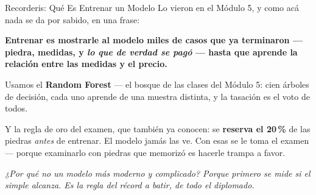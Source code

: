 \documentclass[aspectratio=169, 11pt]{beamer}
\begin{document}
\begin{frame}[shrink=5]{Recorderis: Qué Es Entrenar un Modelo}
  \vspace{2pt}
  {\scriptsize\color{textMuted}
   Lo vieron en el Módulo 5, y como acá nada se da por sabido, en una frase:}
  \vspace{2pt}
  \begin{tcolorbox}[colback=arcaGray, colframe=arcaDark, boxrule=0pt,
    leftrule=4pt, arc=3pt, left=10pt, right=10pt, top=3pt, bottom=3pt]
    {\scriptsize\color{arcaDark}\bfseries
     Entrenar es mostrarle al modelo miles de casos que ya terminaron ---
     piedra, medidas, y \emph{lo que de verdad se pagó} --- hasta que
     aprende la relación entre las medidas y el precio.}
  \end{tcolorbox}
  \vspace{2pt}
  {\scriptsize\color{textMuted}
   Usamos el \textbf{Random Forest} --- el bosque de las clases del Módulo 5:
   cien árboles de decisión, cada uno aprende de una muestra distinta, y la
   tasación es el voto de todos.
   \vspace{2pt}

   Y la regla de oro del examen, que también ya conocen: se \textbf{reserva
   el 20\,\%} de las piedras \emph{antes} de entrenar. El modelo jamás las
   ve. Con esas se le toma el examen --- porque examinarlo con piedras que
   memorizó es hacerle trampa a favor.}
  \vspace{2pt}
  {\scriptsize\color{arcaDark}\itshape
   ¿Por qué no un modelo más moderno y complicado? Porque primero se mide si
   el simple alcanza. Es la regla del récord a batir, de todo el diplomado.}
\end{frame}
\end{document}
